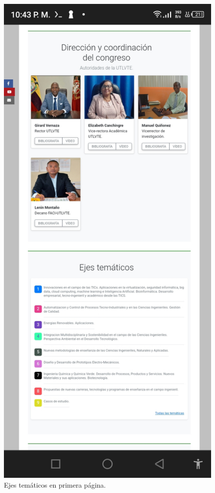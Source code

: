 \documentclass[a4paper,14px]{article}
\begin{document}
\hspace{0.5cm}
        \begin{minipage}[H]{0.45\linewidth}
\begin{figure}[H]
  \centering
  \includegraphics[scale=0.3]{index2.jpg}
  \caption{Ejes temáticos en primera página. }
  \label{fig:arquitectura2}
\end{figure}
  
\end{minipage}
\end{document}
